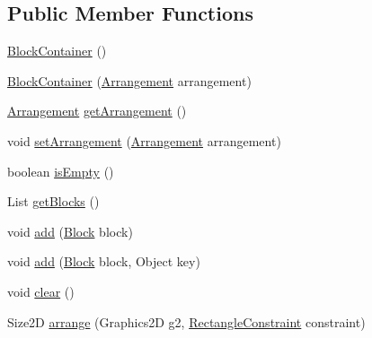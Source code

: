 \subsection*{Public Member Functions}
\begin{DoxyCompactItemize}
\item 
\mbox{\hyperlink{classorg_1_1jfree_1_1chart_1_1block_1_1_block_container_a34bd371757c53973701b501011276993}{Block\+Container}} ()
\item 
\mbox{\hyperlink{classorg_1_1jfree_1_1chart_1_1block_1_1_block_container_aad8ceaa9889a5fd2815bb9f50d9614ce}{Block\+Container}} (\mbox{\hyperlink{interfaceorg_1_1jfree_1_1chart_1_1block_1_1_arrangement}{Arrangement}} arrangement)
\item 
\mbox{\hyperlink{interfaceorg_1_1jfree_1_1chart_1_1block_1_1_arrangement}{Arrangement}} \mbox{\hyperlink{classorg_1_1jfree_1_1chart_1_1block_1_1_block_container_a662ee4268e89f40f5f3f6000d7c7c14d}{get\+Arrangement}} ()
\item 
void \mbox{\hyperlink{classorg_1_1jfree_1_1chart_1_1block_1_1_block_container_a66f84d14a89e3ac4f81898d71b7662c5}{set\+Arrangement}} (\mbox{\hyperlink{interfaceorg_1_1jfree_1_1chart_1_1block_1_1_arrangement}{Arrangement}} arrangement)
\item 
boolean \mbox{\hyperlink{classorg_1_1jfree_1_1chart_1_1block_1_1_block_container_a3fe33aa07a2a666d08c20085c8c2b579}{is\+Empty}} ()
\item 
List \mbox{\hyperlink{classorg_1_1jfree_1_1chart_1_1block_1_1_block_container_a3e0c3b6c32ebec8932603a24776e4faa}{get\+Blocks}} ()
\item 
void \mbox{\hyperlink{classorg_1_1jfree_1_1chart_1_1block_1_1_block_container_a3ff8440bbee1745bbcec898f3a628158}{add}} (\mbox{\hyperlink{interfaceorg_1_1jfree_1_1chart_1_1block_1_1_block}{Block}} block)
\item 
void \mbox{\hyperlink{classorg_1_1jfree_1_1chart_1_1block_1_1_block_container_af5c240d12e9b406df4257062e9ba749e}{add}} (\mbox{\hyperlink{interfaceorg_1_1jfree_1_1chart_1_1block_1_1_block}{Block}} block, Object key)
\item 
void \mbox{\hyperlink{classorg_1_1jfree_1_1chart_1_1block_1_1_block_container_ae061e9cab96f1cd114b35e7e6b619a8a}{clear}} ()
\item 
Size2D \mbox{\hyperlink{classorg_1_1jfree_1_1chart_1_1block_1_1_block_container_af4746269c5628f6ae1ce2be343e5b1e6}{arrange}} (Graphics2D g2, \mbox{\hyperlink{classorg_1_1jfree_1_1chart_1_1block_1_1_rectangle_constraint}{Rectangle\+Constraint}} constraint)

\end{DoxyCompactItemize}
